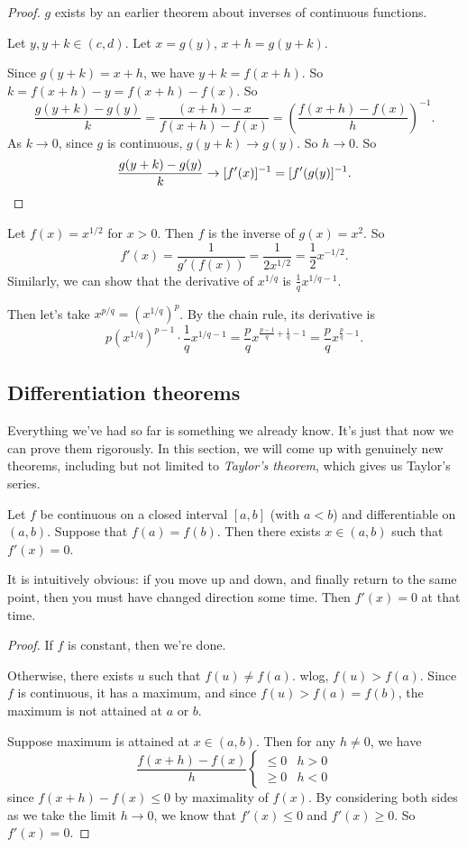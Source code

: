 \documentclass[a4paper]{article}
\begin{document}
\begin{proof}
  $g$ exists by an earlier theorem about inverses of continuous functions.

  Let $y, y + k\in (c, d)$. Let $x = g(y)$, $x + h = g(y + k)$.

  Since $g(y + k) = x + h$, we have $y + k = f(x + h)$. So $k = f(x + h) - y = f(x + h) - f(x)$. So
  \[
    \frac{g(y + k) - g(y)}{k} = \frac{(x + h) - x}{f(x + h) - f(x)} = \left(\frac{f(x + h) - f(x)}{h}\right)^{-1}.
  \]
  As $k \to 0$, since $g$ is continuous, $g(y + k) \to g(y)$. So $h \to 0$. So
  \[
    \frac{g(y + k) - g(y)}{k} \to [f'(x)]^{-1} = [f'(g(y)]^{-1}.\qedhere
  \]
\end{proof}

\begin{eg}
  Let $f(x) = x^{1/2}$ for $x > 0$. Then $f$ is the inverse of $g(x) = x^2$. So
  \[
    f'(x) = \frac{1}{g'(f(x))} = \frac{1}{2x^{1/2}} = \frac{1}{2}x^{-1/2}.
  \]
  Similarly, we can show that the derivative of $x^{1/q}$ is $\frac{1}{q}x^{1/q - 1}$.

  Then let's take $x^{p/q} = (x^{1/q})^p$. By the chain rule, its derivative is
  \[
    p(x^{1/q})^{p - 1}\cdot \frac{1}{q}x^{1/q - 1} = \frac{p}{q}x^{\frac{p - 1}{q} + \frac{1}{q} - 1} = \frac{p}{q}x^{\frac{p}{q} - 1}.
  \]
\end{eg}

\subsection{Differentiation theorems}
Everything we've had so far is something we already know. It's just that now we can prove them rigorously. In this section, we will come up with genuinely new theorems, including but not limited to \emph{Taylor's theorem}, which gives us Taylor's series.

\begin{thm}
  Let $f$ be continuous on a closed interval $[a, b]$ (with $a < b$) and differentiable on $(a, b)$. Suppose that $f(a) = f(b)$. Then there exists $x\in (a, b)$ such that $f'(x) = 0 $.
\end{thm}
It is intuitively obvious: if you move up and down, and finally return to the same point, then you must have changed direction some time. Then $f'(x) = 0$ at that time.

\begin{proof}
  If $f$ is constant, then we're done.

  Otherwise, there exists $u$ such that $f(u) \not= f(a)$. wlog, $f(u) > f(a)$. Since $f$ is continuous, it has a maximum, and since $f(u) > f(a) = f(b)$, the maximum is not attained at $a$ or $b$.

  Suppose maximum is attained at $x\in (a, b)$. Then for any $h \not = 0$, we have
  \[
    \frac{f(x + h) - f(x)}{h}
    \begin{cases}
      \leq 0 & h > 0\\
      \geq 0 & h < 0
    \end{cases}
  \]
  since $f(x + h) - f(x) \leq 0$ by maximality of $f(x)$. By considering both sides as we take the limit $h\to 0$, we know that $f'(x) \leq 0$ and $f'(x) \geq 0$. So $f'(x) = 0$.
\end{proof}
\end{document}
